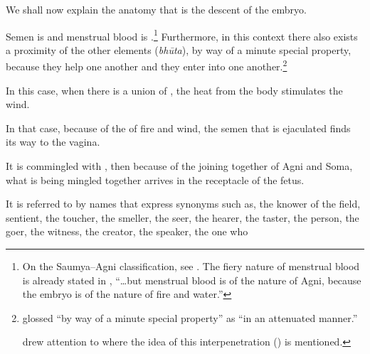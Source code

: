 \begin{translation}


\item[1] 

We shall now explain the anatomy that is the descent of the embryo. 


\item[3]

Semen is  and menstrual blood is
.\footnote{On the Saumya--Agni
    classification, see \cites{wuja-2004}{ange-2021}[521--527]{das-2003}. 
    The fiery nature of menstrual blood is already stated in
    , “\ldots but menstrual blood is of the nature of
    Agni, because the embryo is of the nature of fire and water.”} 
Furthermore, in this context there also exists a proximity of the
other elements (\emph{bhūta}), by way of a minute
special property,
because they help one another and they enter into one
another.\footnote{ glossed 
    “by way of a minute special property” as  “in an
    attenuated manner.”
        
         drew attention
        to  where the idea of this interpenetration
        () is mentioned.}


\item [4]

In this case,
when there is a union of ,
the heat from the body stimulates the wind.

In that case, 
because of the  of fire and wind,
the semen that is ejaculated finds its way to the vagina. 

It is commingled with , then because
of the joining together of Agni and Soma, what is being mingled together
arrives in the receptacle of the fetus. 

It is referred to by names that express synonyms such as,
the knower of the field,
sentient, 
the toucher,
the smeller,
the seer,
the hearer,
the taster, 
the person,
the goer,
the witness,
the creator,
the speaker,
the one who 


\bigskip


\end{translation}
